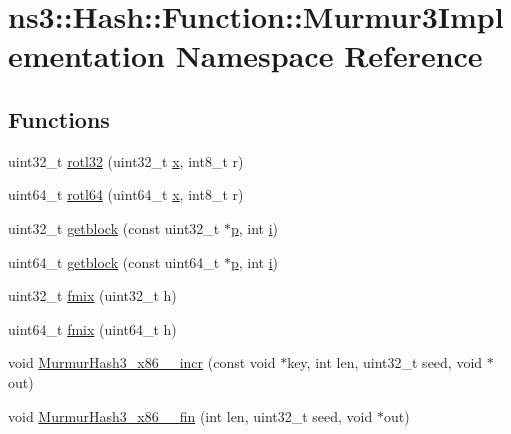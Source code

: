 \hypertarget{namespacens3_1_1Hash_1_1Function_1_1Murmur3Implementation}{}\section{ns3\+:\+:Hash\+:\+:Function\+:\+:Murmur3\+Implementation Namespace Reference}
\label{namespacens3_1_1Hash_1_1Function_1_1Murmur3Implementation}
\subsection*{Functions}
\begin{DoxyCompactItemize}
\item 
uint32\+\_\+t \hyperlink{group__hash__murmur3_ga5ad09e63b7268f407b727713d0f6687a}{rotl32} (uint32\+\_\+t \hyperlink{lte__link__budget__x2__handover__measures_8m_a9336ebf25087d91c818ee6e9ec29f8c1}{x}, int8\+\_\+t r)
\item 
uint64\+\_\+t \hyperlink{group__hash__murmur3_ga5649fec849183845d5f53fd54c9bd509}{rotl64} (uint64\+\_\+t \hyperlink{lte__link__budget__x2__handover__measures_8m_a9336ebf25087d91c818ee6e9ec29f8c1}{x}, int8\+\_\+t r)
\item 
uint32\+\_\+t \hyperlink{group__hash__murmur3_ga82df4ed13fd9546755cdf465105a524c}{getblock} (const uint32\+\_\+t $\ast$\hyperlink{lte__link__budget__x2__handover__measures_8m_ac9de518908a968428863f829398a4e62}{p}, int \hyperlink{lte__uplink__power__control_8m_a6f6ccfcf58b31cb6412107d9d5281426}{i})
\item 
uint64\+\_\+t \hyperlink{group__hash__murmur3_ga45409abb5582f7786cd88c3c8e19744c}{getblock} (const uint64\+\_\+t $\ast$\hyperlink{lte__link__budget__x2__handover__measures_8m_ac9de518908a968428863f829398a4e62}{p}, int \hyperlink{lte__uplink__power__control_8m_a6f6ccfcf58b31cb6412107d9d5281426}{i})
\item 
uint32\+\_\+t \hyperlink{group__hash__murmur3_ga5ace0a4c6b8f2b26528d6b939a6768ac}{fmix} (uint32\+\_\+t h)
\item 
uint64\+\_\+t \hyperlink{group__hash__murmur3_gac511a112658af466a7fd65fcb88c35b9}{fmix} (uint64\+\_\+t h)
\item 
void \hyperlink{group__hash__murmur3_gad303b7fe16fa5487f07a732c50128542}{Murmur\+Hash3\+\_\+x86\+\_\+\_\+incr} (const void $\ast$key, int len, uint32\+\_\+t seed, void $\ast$out)
\item 
void \hyperlink{group__hash__murmur3_gaa7a43fb3327475729d3da771a405aa0c}{Murmur\+Hash3\+\_\+x86\+\_\+\_\+fin} (int len, uint32\+\_\+t seed, void $\ast$out)

\end{DoxyCompactItemize}
